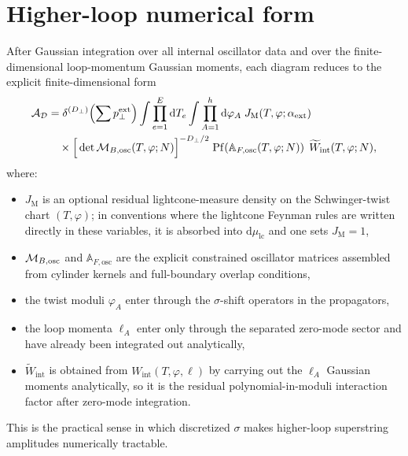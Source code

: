 \documentclass[11pt]{article}
\numberwithin{equation}{section}
\newcommand{\perpD}{D_\perp}
\newcommand{\dd}{\mathrm{d}}
\begin{document}
\section{Higher-loop numerical form}
After Gaussian integration over all internal oscillator data and over the finite-dimensional loop-momentum Gaussian moments, each diagram reduces to the explicit finite-dimensional form
\begin{equation}
\label{eq:s21-001}
\begin{aligned}
{\cal A}_{\cal D}
&=
\delta^{(\perpD)}\!\left(\sum p_\perp^{\mathrm{ext}}\right)
\int\prod_{e=1}^{E}\dd T_e
\int\prod_{A=1}^{h}\dd\varphi_A\;
J_{\mathrm{M}}(T,\varphi;\alpha_{\mathrm{ext}})\\
&\quad\times
\Big[\det {\cal M}_{B,\mathrm{osc}}(T,\varphi;N)\Big]^{-\perpD/2}\;
\mathrm{Pf}\!\left(\mathbb A_{F,\mathrm{osc}}(T,\varphi;N)\right)\;
\widetilde W_{\text{int}}(T,\varphi;N),
\end{aligned}
\end{equation}
where:
\begin{itemize}
\item $J_{\mathrm{M}}$ is an optional residual lightcone-measure density on the Schwinger-twist chart $(T,\varphi)$; in conventions where the lightcone Feynman rules are written directly in these variables, it is absorbed into $\dd\mu_{\mathrm{lc}}$ and one sets $J_{\mathrm{M}}=1$,
\item ${\cal M}_{B,\mathrm{osc}}$ and $\mathbb A_{F,\mathrm{osc}}$ are the explicit constrained oscillator matrices assembled from cylinder kernels and full-boundary overlap conditions,
\item the twist moduli $\varphi_A$ enter through the $\sigma$-shift operators in the propagators,
\item the loop momenta $\ell_A$ enter only through the separated zero-mode sector and have already been integrated out analytically,
\item $\widetilde W_{\text{int}}$ is obtained from $W_{\mathrm{int}}(T,\varphi,\ell)$ by carrying out the $\ell_A$ Gaussian moments analytically, so it is the residual polynomial-in-moduli interaction factor after zero-mode integration.
\end{itemize}
This is the practical sense in which discretized $\sigma$ makes higher-loop superstring amplitudes numerically tractable.
\end{document}

